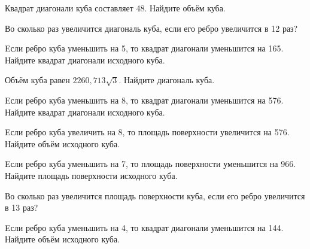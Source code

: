 




\begin{taskBN}{1}
Квадрат диагонали куба составляет 48. Найдите объём куба.
\end{taskBN}

\begin{taskBN}{2}
Во сколько раз увеличится диагональ куба, если его ребро увеличится в 12 раз?
\end{taskBN}

\begin{taskBN}{3}
Eсли ребро куба уменьшить на 5, то квадрат диагонали уменьшится на 165. Найдите квадрат диагонали исходного куба.
\end{taskBN}

\begin{taskBN}{4}
Объём куба равен $2260,713\sqrt{3}$. Найдите диагональ куба.
\end{taskBN}

\begin{taskBN}{5}
Eсли ребро куба уменьшить на 8, то квадрат диагонали уменьшится на 576. Найдите квадрат диагонали исходного куба.
\end{taskBN}

\begin{taskBN}{6}
Eсли ребро куба увеличить на 8, то площадь поверхности увеличится на 576. Найдите объём исходного куба.
\end{taskBN}

\begin{taskBN}{7}
Eсли ребро куба уменьшить на 7, то площадь поверхности уменьшится на 966. Найдите площадь поверхности исходного куба.
\end{taskBN}

\begin{taskBN}{8}
Во сколько раз увеличится площадь поверхности куба, если его ребро увеличится в 13 раз?
\end{taskBN}

\begin{taskBN}{9}
Eсли ребро куба уменьшить на 4, то квадрат диагонали уменьшится на 144. Найдите объём исходного куба.
\end{taskBN}

